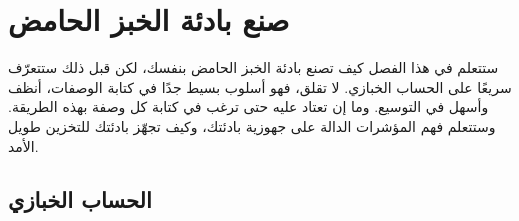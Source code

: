 %
%
%
%
%

\chapter{صنع بادئة الخبز الحامض}%
\label{ch:sourdough-starter}
\begin{quoting}
ستتعلم في هذا الفصل كيف تصنع بادئة الخبز الحامض بنفسك، لكن قبل ذلك ستتعرّف سريعًا على الحساب الخبازي. لا تقلق، فهو أسلوب بسيط جدًا في كتابة الوصفات، أنظف وأسهل في التوسيع. وما إن تعتاد عليه حتى ترغب في كتابة كل وصفة بهذه الطريقة. وستتعلم فهم المؤشرات الدالة على جهوزية بادئتك، وكيف تجهّز بادئتك للتخزين طويل الأمد.
\end{quoting}

\section{الحساب الخبازي}%
\label{sec:bakers-math}

